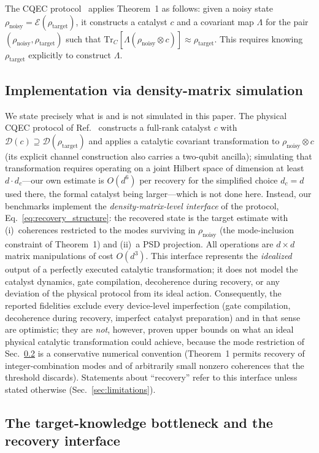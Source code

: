 \documentclass[12pt,a4paper]{article}
\newcommand{\DD}{\mathcal{D}}
\newcommand{\EE}{\mathcal{E}}
\newcommand{\tr}{\mathrm{Tr}}
\newcommand{\rhot}{\rho_\mathrm{target}}
\newcommand{\rhon}{\rho_\mathrm{noisy}}
\begin{document}
The CQEC protocol~\cite{Wakaura2026unified} applies Theorem~1 as follows: given a noisy state $\rhon = \EE(\rhot)$, it constructs a catalyst $c$ and a covariant map $\Lambda$ for the pair $(\rhon, \rhot)$ such that $\tr_C[\Lambda(\rhon \otimes c)] \approx \rhot$.
This requires knowing $\rhot$ explicitly to construct $\Lambda$.

\subsection{Implementation via density-matrix simulation}
\label{sec:implementation}

We state precisely what is and is not simulated in this paper.
The physical CQEC protocol of Ref.~\cite{Wakaura2026unified} constructs a full-rank catalyst $c$ with $\DD(c) \supseteq \DD(\rhot)$ and applies a catalytic covariant transformation to $\rhon \otimes c$ (its explicit channel construction also carries a two-qubit ancilla); simulating that transformation requires operating on a joint Hilbert space of dimension at least $d \cdot d_c$---our own estimate is $O(d^6)$ per recovery for the simplified choice $d_c = d$ used there, the formal catalyst being larger---which is not done here.
Instead, our benchmarks implement the \emph{density-matrix-level interface} of the protocol, Eq.~\eqref{eq:recovery_structure}: the recovered state is the target estimate with (i)~coherences restricted to the modes surviving in $\rhon$ (the mode-inclusion constraint of Theorem~1) and (ii)~a PSD projection.
All operations are $d \times d$ matrix manipulations of cost $O(d^3)$.
This interface represents the \emph{idealized} output of a perfectly executed catalytic transformation; it does not model the catalyst dynamics, gate compilation, decoherence during recovery, or any deviation of the physical protocol from its ideal action.
Consequently, the reported fidelities exclude every device-level imperfection (gate compilation, decoherence during recovery, imperfect catalyst preparation) and in that sense are optimistic; they are \emph{not}, however, proven upper bounds on what an ideal physical catalytic transformation could achieve, because the mode restriction of Sec.~\ref{sec:bottleneck} is a conservative numerical convention (Theorem~1 permits recovery of integer-combination modes and of arbitrarily small nonzero coherences that the threshold discards). Statements about ``recovery'' refer to this interface unless stated otherwise (Sec.~\ref{sec:limitations}).

\subsection{The target-knowledge bottleneck and the recovery interface}
\label{sec:bottleneck}
\end{document}
